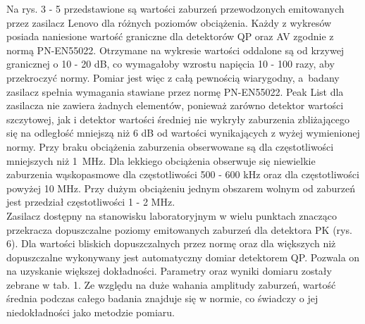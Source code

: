 \documentclass[12pt, a4paper, oneside]{article}
\begin{document}
Na rys. 3 - 5 przedstawione są wartości zaburzeń przewodzonych emitowanych przez zasilacz Lenovo dla różnych poziomów obciążenia. Każdy z wykresów posiada naniesione wartość graniczne dla detektorów QP oraz AV zgodnie z normą PN-EN55022. Otrzymane na wykresie wartości oddalone są od krzywej granicznej o 10 - 20 dB, co wymagałoby wzrostu napięcia 10 - 100 razy, aby przekroczyć normy. Pomiar jest więc z całą pewnością wiarygodny, a~badany zasilacz spełnia wymagania stawiane przez normę PN-EN55022. Peak List dla zasilacza nie zawiera żadnych elementów, ponieważ zarówno detektor wartości szczytowej, jak i detektor wartości średniej nie wykryły zaburzenia zbliżającego się na odległość mniejszą niż 6 dB od wartości wynikających z wyżej wymienionej normy. Przy braku obciążenia zaburzenia obserwowane są dla częstotliwości mniejszych niż 1~MHz. Dla lekkiego obciążenia obserwuje się niewielkie zaburzenia wąskopasmowe dla częstotliwości 500 - 600 kHz oraz dla częstotliwości powyżej 10 MHz. Przy dużym obciążeniu jednym obszarem wolnym od zaburzeń jest przedział częstotliwości 1 - 2 MHz.\\
\indent Zasilacz dostępny na stanowisku laboratoryjnym w wielu punktach znacząco przekracza dopuszczalne poziomy emitowanych zaburzeń dla detektora PK (rys. 6). Dla wartości bliskich dopuszczalnych przez normę oraz dla większych niż dopuszczalne wykonywany jest automatyczny domiar detektorem QP. Pozwala on na uzyskanie większej dokładności. Parametry oraz wyniki domiaru zostały zebrane w tab. 1. Ze względu na duże wahania amplitudy zaburzeń, wartość średnia podczas całego badania znajduje się w normie, co świadczy o jej niedokładności jako metodzie pomiaru.
\end{document}
